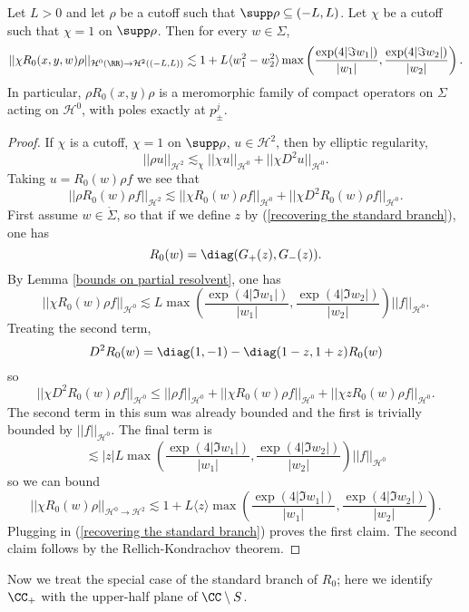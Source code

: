 \begin{lemma}
\label{exponential bound on free resolvent}
Let $L > 0$ and let $\rho$ be a cutoff such that $\supp \rho \subseteq (-L, L)$.
Let $\chi$ be a cutoff such that $\chi = 1$ on $\supp \rho$.
Then for every $w \in \Sigma$,
$$||\chi R_0(x, y, w) \rho||_{\mathcal H^0(\RR) \to \mathcal H^2((-L, L))} \lesssim 1 + L\langle w_1^2 - w_2^2\rangle\max\left(\frac{\exp(4 |\Im w_1|)}{|w_1|}, \frac{\exp(4 |\Im w_2|)}{|w_2|} \right).$$
In particular, $\rho R_0(x, y) \rho$ is a meromorphic family of compact operators on $\Sigma$ acting on $\mathcal H^0$, with poles exactly at $p_\pm^j$.
\end{lemma}
\begin{proof}
If $\chi$ is a cutoff, $\chi = 1$ on $\supp \rho$, $u \in \mathcal H^2$, then by elliptic regularity,
$$||\rho u||_{\mathcal H^2} \lesssim_\chi ||\chi u||_{\mathcal H^0} + ||\chi D^2 u||_{\mathcal H^0}.$$
Taking $u = R_0(w)\rho f$ we see that
$$||\rho R_0(w)\rho f||_{\mathcal H^2} \lesssim ||\chi R_0(w) \rho f||_{\mathcal H^0} + ||\chi D^2 R_0(w) \rho f||_{\mathcal H^0}.$$
First assume $w \in \mathring \Sigma$, so that if we define $z$ by (\ref{recovering the standard branch}), one has
$$R_0(w) = \diag(G_+(z), G_-(z)).$$
By Lemma \ref{bounds on partial resolvent}, one has
$$||\chi R_0(w) \rho f||_{\mathcal H^0} \lesssim L \max\left(\frac{\exp(4 |\Im w_1|)}{|w_1|}, \frac{\exp(4 |\Im w_2|)}{|w_2|} \right) ||f||_{\mathcal H^0}.$$
Treating the second term,
$$D^2R_0(w) = \diag(1, - 1) - \diag(1-z,1+z)R_0(w)$$
so
$$||\chi D^2 R_0(w) \rho f||_{\mathcal H^0} \leq ||\rho f||_{\mathcal H^0} + ||\chi R_0(w) \rho f||_{\mathcal H^0} + ||\chi z R_0(w) \rho f||_{\mathcal H^0}.$$
The second term in this sum was already bounded and the first is trivially bounded by $||f||_{\mathcal H^0}$.
The final term is
$$\lesssim |z|L \max\left(\frac{\exp(4 |\Im w_1|)}{|w_1|}, \frac{\exp(4 |\Im w_2|)}{|w_2|} \right) ||f||_{\mathcal H^0}$$
so we can bound
$$||\chi R_0(w) \rho||_{\mathcal H^0 \to \mathcal H^2} \lesssim 1 + L\langle z\rangle\max\left(\frac{\exp(4 |\Im w_1|)}{|w_1|}, \frac{\exp(4 |\Im w_2|)}{|w_2|} \right).$$
Plugging in (\ref{recovering the standard branch}) proves the first claim.
The second claim follows by the Rellich-Kondrachov theorem.
\end{proof}

Now we treat the special case of the standard branch of $R_0$; here we identify $\CC_+$ with the upper-half plane of $\CC \setminus S$.

